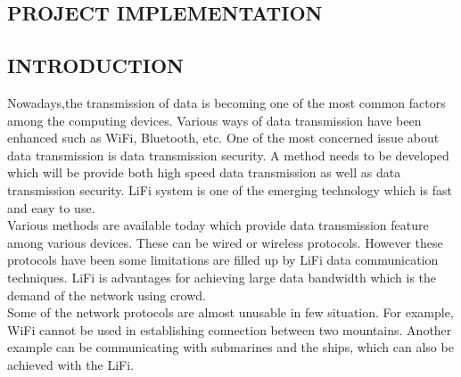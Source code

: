 \documentclass[12pt,a4paper]
{article}
\numberwithin{table}{section}
\begin{document}
{{{{{{{\begin{minipage}{15cm}
\begin{center}
\end{center}
\end{minipage}

\newpage
\begin{center}
\section{PROJECT IMPLEMENTATION}
\end{center}
 {\setlength{\baselineskip}{1.0\baselineskip} 		
  \vspace{0.1in}
  
\subsection{INTRODUCTION}
 Nowadays,the transmission of data is becoming one of the most common factors among the computing devices. Various ways of data transmission have been enhanced such as WiFi, Bluetooth, etc. One of the most concerned issue about data transmission is data transmission security. A method needs to be developed which  will be provide both high speed data transmission as well as data transmission security. LiFi system is one of the emerging technology which is fast and easy to use.\\

\hspace{10 pt}Various methods are available today which provide data transmission feature among various devices. These can be wired or wireless protocols. However these protocols have been some limitations are filled up by LiFi data communication techniques. LiFi is advantages for achieving large data bandwidth which is the demand of the network using crowd.\\

\hspace{10 pt}Some of the network protocols are almost unusable in few situation. For example, WiFi cannot be used in establishing connection between two mountains. Another example can be communicating with submarines and the ships, which can also be achieved with the LiFi.
\\
\\
}}}}}}}}
\end{document}
